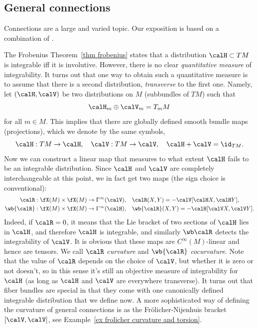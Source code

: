 \subsection{General connections}\label{sec general connections}

Connections are a large and varied topic. Our exposition is based on a combination of \cite{Vakar,RS2,Kolar}.


The Frobenius Theorem~\ref{thm frobenius} states that a distribution $\calH\subset TM$ is integrable iff it is involutive. However, there is no clear \emph{quantitative measure} of integrability. It turns out that one way to obtain such a quantitative measure is to assume that there is a second distribution, \emph{transverse} to the first one. Namely, let $(\calH,\calV)$ be two distributions on $M$ (subbundles of $TM$) such that
\[\calH_m\oplus \calV_m=T_mM\]
for all $m\in M$. This implies that there are globally defined smooth bundle maps (projections), which we denote by the same symbols,
\[\calH:TM\to \calH,\quad \calV:TM\to \calV,\quad \calH+\calV=\id_{TM}.\]
Now we can construct a linear map that measures to what extent $\calH$ fails to be an integrable distribution. Since $\calH$ and $\calV$ are completely interchangeable at this point, we in fact get two maps (the sign choice is conventional):
\begin{align}
    \calR:\fX(M)\times\fX(M)\to \Gamma^\infty(\calV),\quad & \calR(X,Y)=-\calV[\calH X,\calH Y],\\
    \wb{\calR}:\fX(M)\times\fX(M)\to \Gamma^\infty(\calH),\quad & \wb{\calR}(X,Y)=-\calH[\calV X,\calV Y].
\end{align}
Indeed, if $\calR=0$, it means that the Lie bracket of two sections of $\calH$ lies in $\calH$, and therefore $\calH$ is integrable, and similarly $\wb \calR$ detects the integrability of $\calV$. It is obvious that these maps are $C^\infty(M)$-linear and hence are tensors. We call $\calR$ \emph{curvature} and $\wb{\calR}$ \emph{cocurvature}. Note that the value of $\calR$ depends on the choice of $\calV$, but whether it is zero or not doesn't, so in this sense it's still an objective measure of integrability for $\calH$ (as long as $\calH$ and $\calV$ are everywhere transverse). It turns out that fiber bundles are special in that they come with one canonically defined integrable distribution that we define now. A more sophisticated way of defining the curvature of general connections is as the Fr\"olicher-Nijenhuis bracket $[\calV,\calV]$, see Example~\ref{ex frolicher curvature and torsion}.

